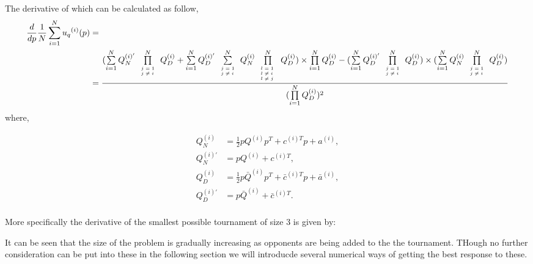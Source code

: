 \documentclass[10pt]{article}
\begin{document}
The derivative of which can be calculated as follow,
{\scriptsize
\begin{align*}
\frac{d}{dp} \frac{1}{N} \sum\limits_{i=1} ^ {N} {u_q}^{(i)} (p) & = \\
& =\frac{
(\sum\limits_{i=1} ^ {N} Q_{N}^{(i)'} \prod\limits_{\tiny\begin{array}{l} j=1 \\ j \neq i \end{array}} ^ N Q_{D}^{(i)}
+ \sum\limits_{i=1} ^ {N} Q_{D}^{(i)'} \sum\limits_{\tiny\begin{array}{l} j=1 \\ j \neq i \end{array}} ^ {N} Q_{N}^{(i)}
\prod\limits_{\tiny\begin{array}{l} l=1 \\ l \neq i \ \\ l \neq j \end{array}} ^ N Q_{D}^{(i)}) \times
\prod\limits_{i=1} ^ N Q_{D}^{(i)} - (\sum\limits_{i=1} ^ {N} Q_{D}^{(i)'}
\prod\limits_{\tiny\begin{array}{l} j=1 \\ j \neq i \end{array}} ^ N Q_{D}^{(i)}) \times 
(\sum\limits_{i=1} ^ {N} Q_{N}^{(i)} \prod\limits_{\tiny\begin{array}{l} j=1 \\ j \neq i \end{array}} ^ N Q_{D}^{(i)})}
{(\prod\limits_{i=1} ^ N Q_{D}^{(i)})^{2}}
\end{align*}
}
where,

\begin{align*}
Q_{N}^{(i) } & = \frac{1}{2} pQ^{(i)} p^T + c^{(i)T} p + a^ {(i)}, \\
Q_{N}^{(i)'} & =  pQ^{(i)} + c^{(i)T}, \\
Q_{D}^{(i) } & = \frac{1}{2} p\bar{Q}^{(i)} p^T + \bar{c}^{(i)T} p + \bar{a}^ {(i)}, \\
Q_{D}^{(i)'} & =  p\bar{Q}^{(i)} + \bar{c}^{(i)T}. \\
\end{align*}

More specifically the derivative of the smallest possible tournament of size 3
is given by:


It can be seen that the size of the problem is gradually increasing as opponents
are being added to the the tournament.
THough no further consideration can be put into these in the following section
we will introducde several numerical ways of getting the best response to these.
\end{document}
